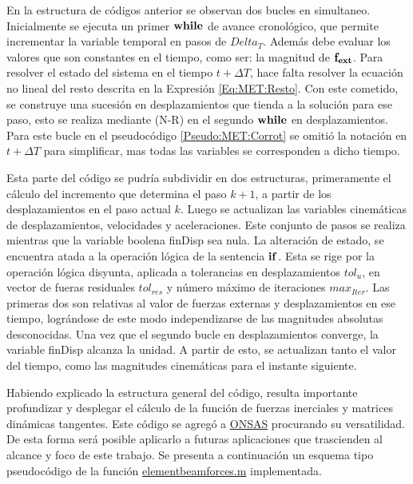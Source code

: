 En la estructura de códigos anterior se observan dos bucles en simultaneo. Inicialmente se ejecuta un primer $\bf{while}$ de avance cronológico, que permite incrementar la variable temporal en pasos de $Delta_T$. Además debe evaluar los valores que son constantes en el tiempo, como ser: la magnitud de $\bf{f}_{ext}$. Para resolver el estado del sistema en el tiempo $t+\Delta T$, hace falta resolver la ecuación no lineal del resto descrita en la Expresión \eqref{Eq:MET:Resto}. Con este cometido, se construye una sucesión en desplazamientos que tienda a la solución para ese paso, esto se realiza mediante (N-R) en el segundo $\bf{while}$ en desplazamientos. Para este bucle en el pseudocódigo \ref{Pseudo:MET:Corrot} se omitió la notación en $t+\Delta T$ para simplificar, mas todas las variables se corresponden a dicho tiempo.

Esta parte del código se pudría subdividir en dos estructuras, primeramente el cálculo del incremento que determina el paso $k+1$, a partir de los desplazamientos en el paso actual $k$. Luego se actualizan las variables cinemáticas de desplazamientos, velocidades y aceleraciones. Este conjunto de pasos se realiza mientras que la variable boolena finDisp sea nula. La alteración de estado, se encuentra atada a la operación lógica de la sentencia $\bf{if}$. Esta se rige por la operación lógica disyunta, aplicada a tolerancias en desplazamientos $tol_u$, en vector de fueras residuales $tol_{res}$ y número máximo de iteraciones $max_{Iter}$. Las primeras dos son relativas al valor de fuerzas externas y desplazamientos en ese tiempo, lográndose de este modo independizarse de las magnitudes absolutas desconocidas. Una vez que el segundo bucle en desplazamientos converge, la variable finDisp alcanza la unidad. A partir de esto, se actualizan tanto el valor del tiempo, como las magnitudes cinemáticas para el instante siguiente.

Habiendo explicado la estructura general del código, resulta importante profundizar y desplegar el cálculo de la función de fuerzas inerciales y matrices dinámicas tangentes. Este código se agregó a \href{https://github.com/ONSAS/ONSAS/}{ONSAS} procurando su versatilidad. De esta forma será posible aplicarlo a futuras aplicaciones que trascienden al alcance y foco de este trabajo. Se presenta a continuación un esquema tipo pseudocódigo de la función \href{https://github.com/ONSAS/ONSAS/blob/master/src/elementBeamForces.m}{elementbeamforces.m} implementada.

